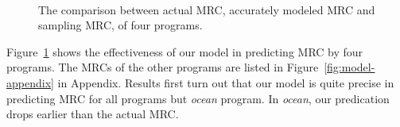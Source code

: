 \documentclass[preprint,nocopyrightspace,10pt]{sigplanconf}
\begin{document}
\begin{figure}[hbpt]
\centering
{}
\hspace*{-1em}
\vspace*{-1em}
\\
\hspace*{-1em}
\caption{The comparison between actual MRC, accurately modeled
MRC and sampling MRC, of four programs.}
\label{fig:model}
\end{figure}

Figure~\ref{fig:model} shows the effectiveness of our model in predicting MRC by four
programs. The MRCs of the other programs are listed in Figure~\ref{fig:model-appendix}
in Appendix. Results first turn out that our model is quite precise in predicting MRC for all programs but 
\emph{ocean} program. In \emph{ocean}, our predication drops earlier than the actual
MRC. 
\end{document}

